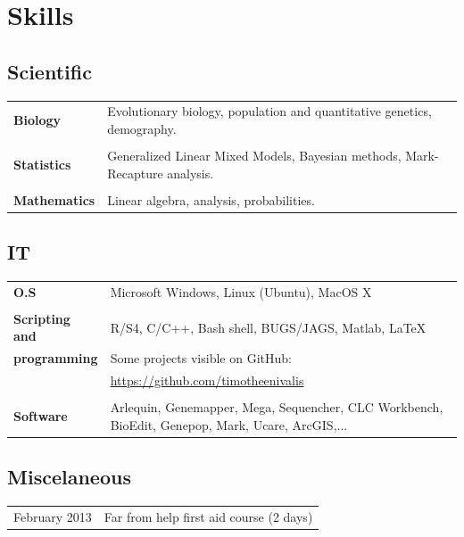 \documentclass[a4paper,10pt]{article} %
\begin{document}
\section*{Skills}
\subsection*{Scientific}
\begin{tabular}{p{4cm}|p{11cm}}
\hfill \textbf{Biology} & Evolutionary biology, population and quantitative genetics, demography.\\
\multicolumn{2}{c}{} \\
\hfill \textbf{Statistics} & Generalized Linear Mixed Models, Bayesian methods, Mark-Recapture analysis.\\
\multicolumn{2}{c}{} \\
\hfill \textbf{Mathematics} & Linear algebra, analysis, probabilities.\\
\end{tabular}

\subsection*{IT}

\begin{tabular}{p{4cm}|p{11cm}}
\hfill \textbf{O.S} & Microsoft Windows, Linux (Ubuntu), MacOS X\\
\multicolumn{2}{c}{} \\
\hfill \textbf{Scripting and} & R/S4, C/C++, Bash shell, BUGS/JAGS, Matlab, \LaTeX\\
\hfill \textbf{programming} & Some projects visible on GitHub: \\
										& \url{https://github.com/timotheenivalis}\\
\multicolumn{2}{c}{} \\
\hfill \textbf{Software} & Arlequin, Genemapper, Mega, Sequencher, CLC Workbench, BioEdit, Genepop, Mark, Ucare, ArcGIS,...\\
\end{tabular}

\subsection*{Miscelaneous}
\begin{tabular}{p{4cm}|p{11cm}}
\hfill February 2013 & Far from help first aid course (2 days)\\
\end{tabular}
\end{document}
